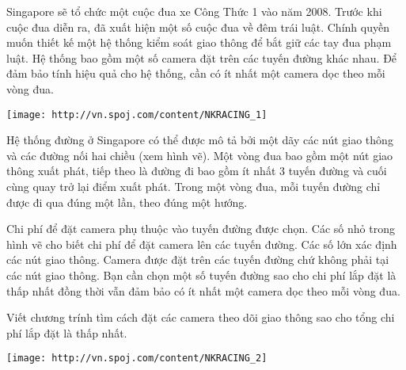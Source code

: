 Singapore sẽ tổ chức một cuộc đua xe Công Thức 1 vào năm 2008. Trước khi cuộc đua diễn ra, đã xuất hiện một số cuộc đua về đêm trái luật. Chính quyền muốn thiết kế một hệ thống kiểm soát giao   thông để bắt giữ các tay đua phạm luật. Hệ thống bao gồm một số camera đặt trên các tuyến đường khác nhau. Để đảm bảo tính hiệu quả cho hệ thống, cần có ít nhất một camera dọc theo mỗi vòng đua.  


\texttt{[image: http://vn.spoj.com/content/NKRACING\_1]}

   Hệ thống đường ở Singapore có thể được mô tả bởi một dãy các nút giao thông và các đường nối hai chiều (xem hình vẽ). Một vòng đua bao gồm một nút giao thông xuất phát, tiếp theo là đường đi bao   gồm ít nhất 3 tuyến đường và cuối cùng quay trở lại điểm xuất phát. Trong một vòng đua, mỗi tuyến đường chỉ được đi qua đúng một lần, theo đúng một hướng.  

   Chi phí để đặt camera phụ thuộc vào tuyến đường được chọn. Các số nhỏ trong hình vẽ cho biết chi phí để đặt camera lên các tuyến đường. Các số lớn xác định các nút giao thông. Camera được đặt trên   các tuyến đường chứ không phải tại các nút giao thông. Bạn cần chọn một số tuyến đường sao cho chi phí lắp đặt là thấp nhất đồng thời vẫn đảm bảo có ít nhất một camera dọc theo mỗi vòng đua.  

   Viết chương trính tìm cách đặt các camera theo dõi giao thông sao cho tổng chi phí lắp đặt là thấp nhất.  


\texttt{[image: http://vn.spoj.com/content/NKRACING\_2]}

\